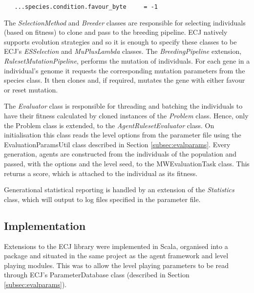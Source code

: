 \begin{minipage}{0.9\linewidth}
\centering
\begin{lstlisting}
   ...species.condition.favour_byte 	= -1
\end{lstlisting}
\end{minipage}


The \emph{SelectionMethod} and \emph{Breeder} classes are responsible for selecting individuals (based on fitness) to clone and pass to the breeding pipeline. ECJ natively supports evolution strategies and so it is enough to specify these classes to be ECJ's \emph{ESSelection} and \emph{MuPlusLambda} classes. The \emph{BreedingPipeline} extension, \emph{RulesetMutationPipeline}, performs the mutation of individuals. For each gene in a individual's genome it requests the corresponding mutation parameters from the species class. It then clones and, if required, mutates the gene with either favour or reset mutation. 

The \emph{Evaluator} class is responsible for threading and batching the individuals to have their fitness calculated by cloned instances of the \emph{Problem} class. Hence, only the Problem class is extended, to the \emph{AgentRulesetEvaluator} class. On initialisation this class reads the level options from the parameter file using the EvaluationParamsUtil class described in Section \ref{subsec:evalparams}. Every generation, agents are constructed from the individuals of the population and passed, with the options and the level seed, to the MWEvaluationTask class. This returns a score, which is attached to the individual as its fitness.

Generational statistical reporting is handled by an extension of the \emph{Statistics} class, which will output to log files specified in the parameter file.




\subsection{Implementation}

Extensions to the ECJ library were implemented in Scala, organised into a package and situated in the same project as the agent framework and level playing modules. This was to allow the level playing parameters to be read through ECJ's ParameterDatabase class (described in Section \ref{subsec:evalparams}).

